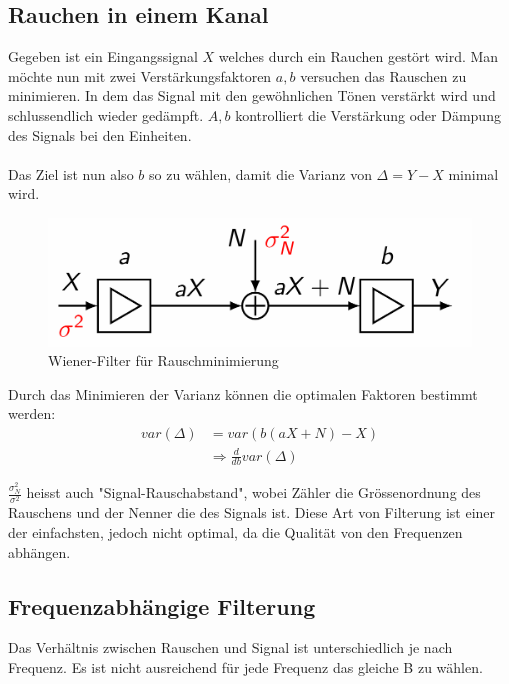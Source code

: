 \documentclass[../Main.tex]{subfiles}
\begin{document}
\subsection{Rauchen in einem Kanal}
Gegeben ist ein Eingangssignal \(X\) welches durch ein Rauchen gestört wird.
Man möchte nun mit zwei Verstärkungsfaktoren \(a,b\) versuchen das Rauschen zu minimieren.
In dem das Signal mit den gewöhnlichen Tönen verstärkt wird und schlussendlich wieder gedämpft.
\(A,b\) kontrolliert die Verstärkung oder Dämpung des Signals bei den Einheiten.
\\\\
Das Ziel ist nun also \(b\) so zu wählen, damit die Varianz von \(\Delta=Y-X\) minimal wird.

\begin{figure}[H]
    \centering
    \includegraphics[width=0.5\linewidth]{Images/wiener-filter.png}
    \caption{Wiener-Filter für Rauschminimierung}
\end{figure}

Durch das Minimieren der Varianz können die optimalen Faktoren bestimmt werden:
\begin{equation}
    \begin{split}
        var(\Delta) &= var(b(aX+N)-X)\\
        &\Rightarrow \frac{d}{db}var(\Delta)
    \end{split}
\end{equation}

\(\frac{\sigma_N^2}{\sigma^2}\) heisst auch "Signal-Rauschabstand", wobei Zähler
die Grössenordnung des Rauschens und der Nenner die des Signals ist.
Diese Art von Filterung ist einer der einfachsten, jedoch nicht optimal, da
die Qualität von den Frequenzen abhängen.

\subsection{Frequenzabhängige Filterung}
Das Verhältnis zwischen Rauschen und Signal ist unterschiedlich je nach Frequenz.
Es ist nicht ausreichend für jede Frequenz das gleiche B zu wählen.
\end{document}

